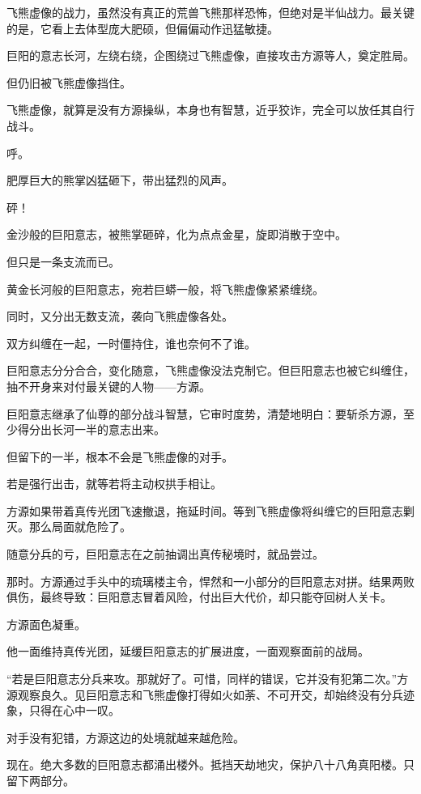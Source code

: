 
\begin{this_body}

飞熊虚像的战力，虽然没有真正的荒兽飞熊那样恐怖，但绝对是半仙战力。最关键的是，它看上去体型庞大肥硕，但偏偏动作迅猛敏捷。

巨阳的意志长河，左绕右绕，企图绕过飞熊虚像，直接攻击方源等人，奠定胜局。

但仍旧被飞熊虚像挡住。

飞熊虚像，就算是没有方源操纵，本身也有智慧，近乎狡诈，完全可以放任其自行战斗。

呼。

肥厚巨大的熊掌凶猛砸下，带出猛烈的风声。

砰！

金沙般的巨阳意志，被熊掌砸碎，化为点点金星，旋即消散于空中。

但只是一条支流而已。

黄金长河般的巨阳意志，宛若巨蟒一般，将飞熊虚像紧紧缠绕。

同时，又分出无数支流，袭向飞熊虚像各处。

双方纠缠在一起，一时僵持住，谁也奈何不了谁。

巨阳意志分分合合，变化随意，飞熊虚像没法克制它。但巨阳意志也被它纠缠住，抽不开身来对付最关键的人物——方源。

巨阳意志继承了仙尊的部分战斗智慧，它审时度势，清楚地明白：要斩杀方源，至少得分出长河一半的意志出来。

但留下的一半，根本不会是飞熊虚像的对手。

若是强行出击，就等若将主动权拱手相让。

方源如果带着真传光团飞速撤退，拖延时间。等到飞熊虚像将纠缠它的巨阳意志剿灭。那么局面就危险了。

随意分兵的亏，巨阳意志在之前抽调出真传秘境时，就品尝过。

那时。方源通过手头中的琉璃楼主令，悍然和一小部分的巨阳意志对拼。结果两败俱伤，最终导致：巨阳意志冒着风险，付出巨大代价，却只能夺回树人关卡。

方源面色凝重。

他一面维持真传光团，延缓巨阳意志的扩展进度，一面观察面前的战局。

“若是巨阳意志分兵来攻。那就好了。可惜，同样的错误，它并没有犯第二次。”方源观察良久。见巨阳意志和飞熊虚像打得如火如荼、不可开交，却始终没有分兵迹象，只得在心中一叹。

对手没有犯错，方源这边的处境就越来越危险。

现在。绝大多数的巨阳意志都涌出楼外。抵挡天劫地灾，保护八十八角真阳楼。只留下两部分。


\end{this_body}
